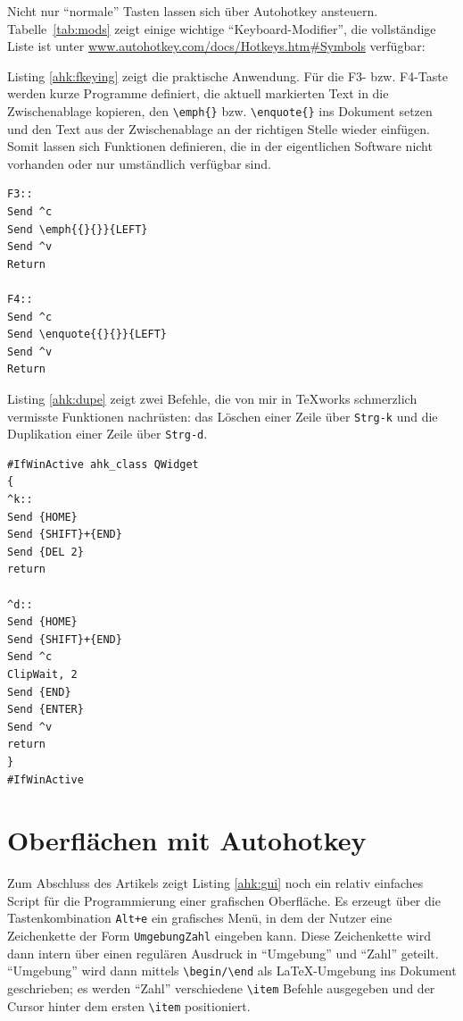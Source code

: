 \documentclass[ngerman]{dtk}%
\newcommand{\ahk}{Autohotkey\xspace}
\begin{document}
Nicht nur \enquote{normale} Tasten lassen sich über \ahk ansteuern. Tabelle~\ref{tab:mods} zeigt einige wichtige \enquote{Keyboard-Modifier}, die vollständige Liste ist unter \url{www.autohotkey.com/docs/Hotkeys.htm#Symbols} verfügbar:

Listing \ref{ahk:fkeying} zeigt die praktische Anwendung. Für die F3- bzw. F4-Taste werden kurze Programme definiert, die aktuell markierten Text in die Zwischenablage kopieren, den \verb|\emph{}| bzw. \verb|\enquote{}| ins Dokument setzen und den Text aus der Zwischenablage an der richtigen Stelle wieder einfügen. Somit lassen sich Funktionen definieren, die in der eigentlichen Software nicht vorhanden oder nur umständlich verfügbar sind.

\begin{lstlisting}[frame=single,caption={Programmierung der F-Tasten mit \ahk},label={ahk:fkeying}]
F3::
Send ^c
Send \emph{{}{}}{LEFT}
Send ^v
Return

F4::
Send ^c
Send \enquote{{}{}}{LEFT}
Send ^v
Return
\end{lstlisting}

Listing \ref{ahk:dupe} zeigt zwei Befehle, die von mir in \TeX works schmerzlich vermisste Funktionen nachrüsten: das Löschen einer Zeile über \verb|Strg-k| und die Duplikation einer Zeile über \verb|Strg-d|.

\begin{lstlisting}[frame=single,caption={Zeilen duplizieren und löschen},label={ahk:dupe}]
#IfWinActive ahk_class QWidget
{
^k:: 
Send {HOME}
Send {SHIFT}+{END}
Send {DEL 2}
return

^d::
Send {HOME}
Send {SHIFT}+{END}
Send ^c
ClipWait, 2
Send {END}
Send {ENTER}
Send ^v
return
}
#IfWinActive 
\end{lstlisting}

\section{Oberflächen mit \ahk}

Zum Abschluss des Artikels zeigt Listing \ref{ahk:gui} noch ein relativ einfaches Script für die Programmierung einer grafischen Oberfläche. Es erzeugt über die Tastenkombination \verb|Alt+e| ein grafisches Menü, in dem der Nutzer eine Zeichenkette der Form \verb|UmgebungZahl| eingeben kann. Diese Zeichenkette wird dann intern über einen regulären Ausdruck in \enquote{Umgebung} und \enquote{Zahl} geteilt. \enquote{Umgebung} wird dann mittels \verb|\begin/\end| als \LaTeX-Umgebung ins Dokument geschrieben; es werden  \enquote{Zahl} verschiedene \verb|\item| Befehle ausgegeben und der Cursor hinter dem ersten \verb|\item| positioniert.
\end{document}
